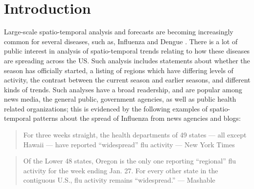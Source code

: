 \section*{Introduction}


Large-scale spatio-temporal analysis and forecasts are becoming increasingly common for several diseases,
such as, Influenza \cite{chakraborty:sdm14, wang:kdd16, tizzoni2012real, brooks:ploscb15} and Dengue \cite{johnson2018}.
There is a lot of public interest in analysis of spatio-temporal trends
relating to how these diseases are spreading across the US.
Such analysis includes statements about whether the season has officially 
started, a listing of regions which have differing levels of activity,
the contrast between the current season and earlier seasons, 
and different kinds of trends.
Such analyses have a broad readership,
and are popular among news media, the general public, government agencies,
as well as public health related organizations; 
this is evidenced by the following
examples of spatio-temporal patterns about the spread of Influenza from
news agencies and blogs:
\begin{quote}
For three weeks straight, the health departments of 49 states
--- all except Hawaii --- have reported ``widespread'' flu activity
--- New York Times~\cite{nytimes}
\end{quote}
\begin{quote}
Of the Lower 48 states, Oregon is the only one reporting ``regional''
flu activity for the week ending Jan. 27. For every other state in the contiguous
U.S., flu activity remains ``widespread.'' --- Mashable~\cite{mashable}
\end{quote}

